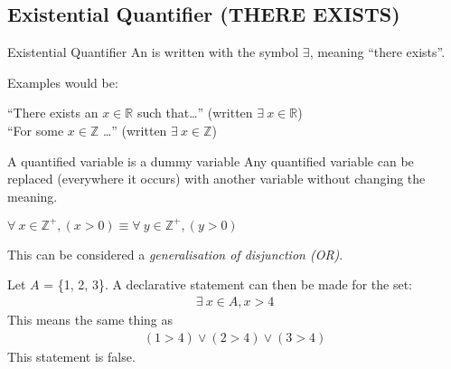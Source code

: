 \documentclass[../notes.tex]{subfiles}
\begin{document}
			\subsection[Existential Quantifier]{Existential Quantifier (THERE EXISTS)}
				\begin{definition}[width=0.85\textwidth]{Existential Quantifier}
					An  is written with the symbol $\exists $, meaning ``there exists''.
				\end{definition}
				\begin{example}[width=0.65\textwidth]
					Examples would be:
					\begin{indentparagraph}
						``There exists an $x \in \mathbb{R}$ such that\ldots'' (written $\exists \: x \in \mathbb{R}$)\\
						``For some $x \in \mathbb{Z}$ \ldots'' (written $\exists \: x \in \mathbb{Z}$)
					\end{indentparagraph}
				\end{example}
				\begin{sidenote}{A quantified variable is a dummy variable}
					Any quantified variable can be replaced (everywhere it occurs) with another variable without changing the meaning.
					\begin{example}[hbox]
						$\forall \: x \in \mathbb{Z}^{+}, (x > 0) \equiv \forall \: y \in \mathbb{Z}^{+}, (y > 0)$
					\end{example}
				\end{sidenote}
				This can be considered a \emph{generalisation of disjunction (OR)}.
				\begin{example}[width=0.9\textwidth]
					Let $A$ = \{1, 2, 3\}. A declarative statement can then be made for the set:
					\begin{align*}
						\exists \: x \in A, x > 4
					\end{align*}
					This means the same thing as 
					\begin{align*}
						(1 > 4) \lor (2 > 4) \lor (3 > 4)
					\end{align*}
					This statement is false.
				\end{example}
\end{document}
